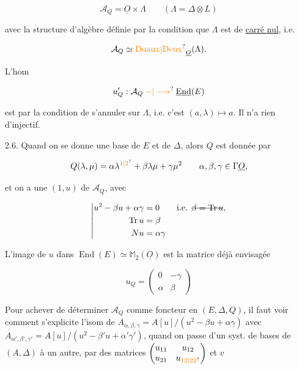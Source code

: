 \[
\mathcal A_Q=\underline O\times\Lambda\qquad(\Lambda=\Delta\otimes L)
\]

avec la structure d'algèbre définie par la condition que $\Lambda$ est de \uline{carré nul}, i.e.

\[
\mathcal A_Q\simeq\operatorname{\unsure{Duaux|Deux}}_{\underline O}(\Lambda).
\]

L'hom

\[
u'_Q:\mathcal A_Q\mathbin{\unsure{-|\longrightarrow}}\underline{\operatorname{End}}(E)
\]

est  par la condition  de s'annuler sur $\Lambda$, i.e. c'est $(a,\lambda)\longmapsto a$.  Il n'a rien d'injectif.

2.6. Quand on se donne une base de $E$ et de $\Delta$, alors $Q$ est donnée par

\[
Q(\lambda,\mu)=\alpha\lambda^{\unsure{1|2}}+\beta\lambda\mu+\gamma\mu^2
\qquad\alpha,\beta,\gamma\in\Gamma\underline O,
\]

et on  a une  $(1,u)$ de $\mathcal A_Q$, avec

\[
\left|\begin{aligned}
u^2-\beta u+\alpha\gamma&=0\qquad\text{i.e. }\deleted{\beta=\operatorname{Tr}u},\\
\operatorname{Tr}u&=\beta\\
Nu&=\alpha\gamma
\end{aligned}\right.
\]

L'image de $u$ dans $\operatorname{End}(E)\simeq\mathbb M_2(\underline O)$ est la matrice déjà envisagée

\[
u_Q=\begin{pmatrix}0&-\gamma\\\alpha&\beta\end{pmatrix}
\]

Pour achever de déterminer $\mathcal A_Q$ comme foncteur en $(E,\Delta,Q)$, il faut voir comment s'explicite l'isom de $A_{\alpha,\beta,\gamma}=A[u]/(u^2-\beta u+\alpha\gamma)$ avec $A_{\alpha',\beta',\gamma'}=A[u]/(u^2-\beta'u+\alpha'\gamma')$, quand on passe d'un syst. de bases de $(A,\Delta)$ à un autre, par des matrices $\begin{pmatrix}u_{11}&u_{12}\\u_{21}&u_{\unsure{12|22}}\end{pmatrix}$ et $v$ 

